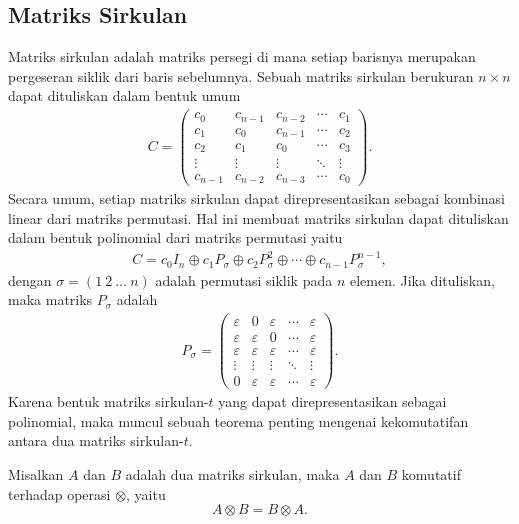 \subsection{Matriks Sirkulan}

Matriks sirkulan adalah matriks persegi di mana setiap barisnya merupakan pergeseran siklik dari baris sebelumnya. Sebuah matriks sirkulan berukuran $n \times n$ dapat dituliskan dalam bentuk umum
\begin{align*}
  C =
  \begin{pmatrix}
    c_0     & c_{n-1} & c_{n-2} & \cdots & c_1    \\
    c_1     & c_0     & c_{n-1} & \cdots & c_2    \\
    c_2     & c_1     & c_0     & \cdots & c_3    \\
    \vdots  & \vdots  & \vdots  & \ddots & \vdots \\
    c_{n-1} & c_{n-2} & c_{n-3} & \cdots & c_0
  \end{pmatrix}.
\end{align*}
Secara umum, setiap matriks sirkulan dapat direpresentasikan sebagai kombinasi linear dari matriks permutasi. Hal ini membuat matriks sirkulan dapat
dituliskan dalam bentuk polinomial dari matriks permutasi yaitu
\begin{align*}
  C = c_0 I_n \oplus c_1 P_{\sigma} \oplus c_2 P_{\sigma}^{2} \oplus \cdots \oplus c_{n-1} P_{\sigma}^{n-1},
\end{align*}
dengan $\sigma = (1\ 2\ \ldots\ n)$ adalah permutasi siklik pada $n$ elemen. Jika dituliskan, maka matriks $P_{\sigma}$ adalah
\begin{align*}
  P_{\sigma} =
  \begin{pmatrix}
    \varepsilon & 0           & \varepsilon & \cdots & \varepsilon \\
    \varepsilon & \varepsilon & 0           & \cdots & \varepsilon \\
    \varepsilon & \varepsilon & \varepsilon & \cdots & \varepsilon \\
    \vdots      & \vdots      & \vdots      & \ddots & \vdots      \\
    0           & \varepsilon & \varepsilon & \cdots & \varepsilon
  \end{pmatrix}.
\end{align*}
Karena bentuk matriks sirkulan-$t$ yang dapat direpresentasikan sebagai polinomial, maka muncul sebuah teorema penting mengenai kekomutatifan antara dua matriks sirkulan-$t$.
\begin{teorema}\label{thm:komutatif_matriks_sirkulan}
  Misalkan $A$ dan $B$ adalah dua matriks sirkulan, maka $A$ dan $B$ komutatif terhadap operasi $\otimes$, yaitu
  \[
    A \otimes B = B \otimes A.
  \]
\end{teorema}

